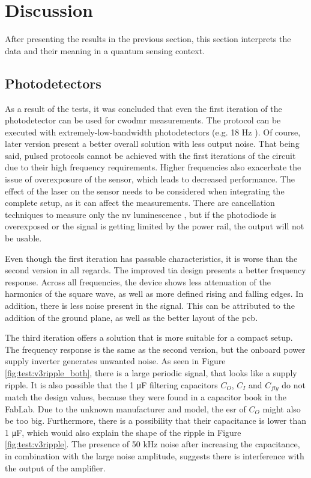 \section{Discussion}
After presenting the results in the previous section, this section interprets the data and their meaning in a quantum sensing context. 

\subsection{Photodetectors}
As a result of the tests, it was concluded that even the first iteration of the photodetector can be used for \gls{cwodmr} measurements. The protocol can be executed with extremely-low-bandwidth photodetectors (e.g. 18 \unit{\hertz} \cite{acharya2025compact}). Of course, later version present a better overall solution with less output noise. That being said, pulsed protocols cannot be achieved with the first iterations of the circuit due to their high frequency requirements. Higher frequencies also exacerbate the issue of overexposure of the sensor, which leads to decreased performance. The effect of the laser on the sensor needs to be considered when integrating the complete setup, as it can affect the measurements. There are cancellation techniques to measure only the \gls{nv} luminescence \cite{sewani2020coherent}, but if the photodiode is overexposed or the signal is getting limited by the power rail, the output will not be usable. 

Even though the first iteration has passable characteristics, it is worse than the second version in all regards. The improved \gls{tia} design presents a better frequency response. Across all frequencies, the device shows less attenuation of the harmonics of the square wave, as well as more defined rising and falling edges. In addition, there is less noise present in the signal. This can be attributed to the addition of the ground plane, as well as the better layout of the \gls{pcb}. 

The third iteration offers a solution that is more suitable for a compact setup. The frequency response is the same as the second version, but the onboard power supply inverter generates unwanted noise. As seen in Figure \ref{fig:test:v3ripple_both}, there is a large periodic signal, that looks like a supply ripple. It is also possible that the 1 \unit{\micro\farad} filtering capacitors $C_O$, $C_I$ and $C_{fly}$ do not match the design values, because they were found in a capacitor book in the FabLab. Due to the unknown manufacturer and model, the \gls{esr} of $C_O$ might also be too big. Furthermore, there is a possibility that their capacitance is lower than 1 \unit{\micro\farad}, which would also explain the shape of the ripple in Figure \ref{fig:test:v3ripple}. The presence of 50 \unit{\kilo\hertz} noise after increasing the capacitance, in combination with the large noise amplitude, suggests there is interference with the output of the amplifier.

